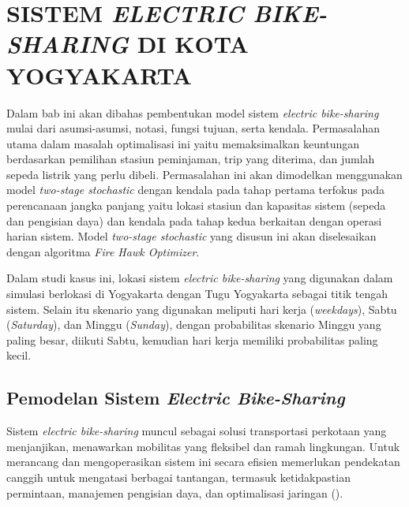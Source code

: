 \chapter{SISTEM \textit{ELECTRIC BIKE-SHARING} DI KOTA YOGYAKARTA}

Dalam bab ini akan dibahas pembentukan model sistem \textit{electric bike-sharing} mulai dari asumsi-asumsi, notasi, fungsi tujuan, serta kendala. Permasalahan utama dalam masalah optimalisasi ini yaitu memaksimalkan keuntungan berdasarkan pemilihan stasiun peminjaman, trip yang diterima, dan jumlah sepeda listrik yang perlu dibeli. Permasalahan ini akan dimodelkan menggunakan model \textit{two-stage stochastic} dengan kendala pada tahap pertama terfokus pada perencanaan jangka panjang yaitu lokasi stasiun dan kapasitas sistem (sepeda dan pengisian daya) dan kendala pada tahap kedua berkaitan dengan operasi harian sistem. Model \textit{two-stage stochastic} yang disusun ini akan diselesaikan dengan algoritma \textit{Fire Hawk Optimizer}.

Dalam studi kasus ini, lokasi sistem \textit{electric bike-sharing} yang digunakan dalam simulasi berlokasi di Yogyakarta dengan Tugu Yogyakarta sebagai titik tengah sistem. Selain itu skenario yang digunakan meliputi hari kerja (\textit{weekdays}), Sabtu (\textit{Saturday}), dan Minggu (\textit{Sunday}), dengan probabilitas skenario Minggu yang paling besar, diikuti Sabtu, kemudian hari kerja memiliki probabilitas paling kecil. 

\section{Pemodelan Sistem \textit{Electric Bike-Sharing}}
Sistem \textit{electric bike-sharing} muncul sebagai solusi transportasi perkotaan yang menjanjikan, menawarkan mobilitas yang fleksibel dan ramah lingkungan. Untuk merancang dan mengoperasikan sistem ini secara efisien memerlukan pendekatan canggih untuk mengatasi berbagai tantangan, termasuk ketidakpastian permintaan, manajemen pengisian daya, dan optimalisasi jaringan ().

